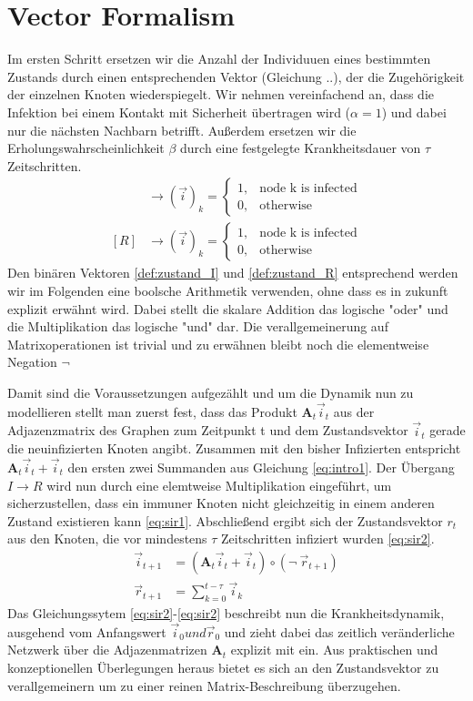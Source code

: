 \section{Vector Formalism}
Im ersten Schritt ersetzen wir die Anzahl der Individuuen eines bestimmten Zustands durch einen entsprechenden Vektor (Gleichung ..), der die Zugehörigkeit der einzelnen Knoten wiederspiegelt. Wir nehmen vereinfachend an, dass die Infektion bei einem Kontakt mit Sicherheit übertragen wird ($\alpha = 1$) und dabei nur die nächsten Nachbarn betrifft. Außerdem ersetzen wir die Erholungswahrscheinlichkeit $\beta$ durch eine festgelegte Krankheitsdauer von $\tau$ Zeitschritten.
\begin{align}
 [I] &\rightarrow (\vec{i})_k =\left\{\begin{array}{ll} 
					1, & \text{node k is infected} \\
					0, & \text{otherwise}\end{array}\right. \label{def:zustand_I} \\
 [R] &\rightarrow (\vec{i})_k =\left\{\begin{array}{ll} 
					1, & \text{node k is infected} \\
					0, & \text{otherwise}\end{array}\right. \label{def:zustand_R}
\end{align}
Den binären Vektoren \ref{def:zustand_I} und \ref{def:zustand_R} entsprechend werden wir im Folgenden eine boolsche Arithmetik verwenden, ohne dass es in zukunft explizit erwähnt wird. Dabei stellt die skalare Addition das logische "oder" und die Multiplikation das logische "und" dar. Die verallgemeinerung auf Matrixoperationen ist trivial und zu erwähnen bleibt noch die elementweise Negation $\neg$

Damit sind die Voraussetzungen aufgezählt und um die Dynamik nun zu modellieren stellt man zuerst fest, dass das Produkt $\textbf{A}_t\vec{i}_t$ aus der Adjazenzmatrix des Graphen zum Zeitpunkt t und dem Zustandsvektor $\vec{i}_t$ gerade die neuinfizierten Knoten angibt. Zusammen mit den bisher Infizierten entspricht $\textbf{A}_t\vec{i}_t+\vec{i}_t$ den ersten zwei Summanden aus Gleichung \ref{eq:intro1}. Der Übergang $I \rightarrow R$ wird nun durch eine elemtweise Multiplikation eingeführt, um sicherzustellen, dass ein immuner Knoten nicht gleichzeitig in einem anderen Zustand existieren kann \ref{eq:sir1}. Abschließend ergibt sich der Zustandsvektor $r_t$ aus den Knoten, die vor mindestens $\tau$ Zeitschritten infiziert wurden \ref{eq:sir2}. 
\begin{align}
 \vec{i}_{t+1} &= (\textbf{A}_t \vec{i}_t + \vec{i}_t) \circ (\neg ~ \vec{r}_{t+1}) \label{eq:sir1} \\
 \vec{r}_{t+1} &= \sum_{k=0}^{t-\tau} \vec{i}_k \label{eq:sir2}
\end{align}
Das Gleichungssytem \ref{eq:sir2}-\ref{eq:sir2} beschreibt nun die Krankheitsdynamik, ausgehend vom Anfangswert $\vec{i}_0 und \vec{r}_0$ und zieht dabei das zeitlich veränderliche Netzwerk über die Adjazenmatrizen $\textbf{A}_t$ explizit mit ein. Aus praktischen und konzeptionellen Überlegungen heraus bietet es sich an den Zustandsvektor zu verallgemeinern um zu einer reinen Matrix-Beschreibung überzugehen. 

